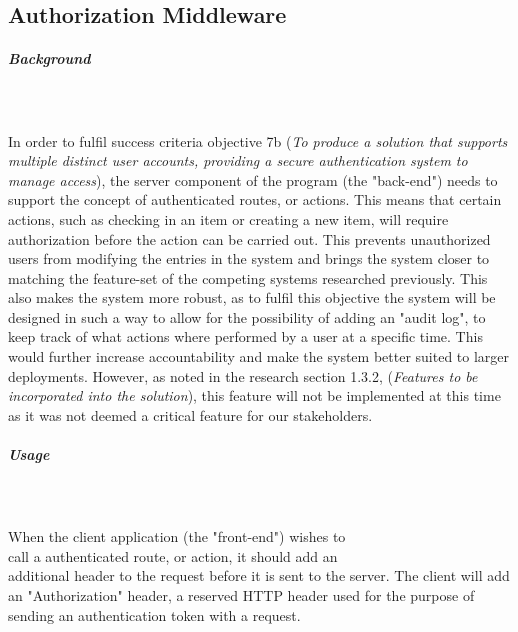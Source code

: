\documentclass[../../main.tex]{subfiles}
\begin{document}
\begin{dummyenv}
    \setlength{\parindent}{0mm}
    \begin{minipage}[t]{1\linewidth}
        \paragraph{} %

        \subsection{Authorization Middleware}

        \subparagraph{Background}

        \noindent \\\\ In order to fulfil success criteria objective 7b (\textit{To produce a solution that supports multiple
            distinct user accounts, providing a secure authentication system to manage access}), the server component of
        the program (the "back-end") needs to support the concept of authenticated routes, or actions.
        This means that certain actions, such as checking in an item or creating a new item, will require authorization
        before the action can be carried out. This prevents unauthorized users from modifying the entries in the system
        and brings the system closer to matching the feature-set of the competing systems researched previously. This
        also makes the system more robust, as to fulfil this objective the system will be designed in such a way
        to allow for the possibility of adding an "audit log", to keep track of what actions where performed by
        a user at a specific time. This would further increase accountability and make the system better suited to larger
        deployments. However, as noted in the research section 1.3.2, (\textit{Features to be incorporated into the solution}),
        this feature will not be implemented at this time as it was not deemed a critical feature for our stakeholders.

    \end{minipage}
\end{dummyenv}

\subparagraph{Usage}

\noindent \\\\ When the client application (the "front-end") wishes to\\call a authenticated route, or action, it
should add an\\additional header to the request before it is sent to the server. The client will add an "Authorization"
header, a reserved HTTP header used for the purpose of sending an authentication token with a request.
\end{document}
